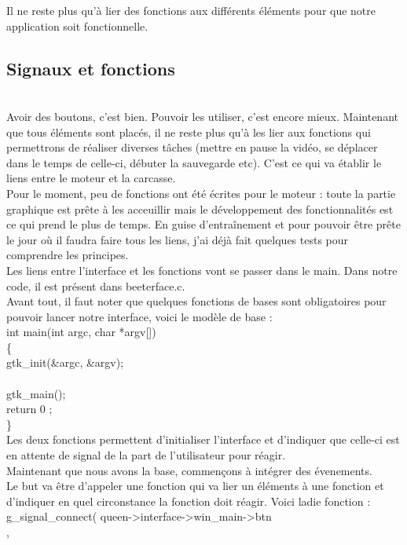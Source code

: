 \documentclass[11pt,french,a4paper]{report}
\begin{document}
Il ne reste plus qu'à lier des fonctions aux différents éléments pour que notre application soit 
fonctionnelle.\\
        
        \subsection{Signaux et fonctions} \\
Avoir des boutons, c'est bien. Pouvoir les utiliser, c'est encore mieux. Maintenant que tous éléments sont placés, 
il ne reste plus qu'à les lier aux fonctions qui permettrons de réaliser diverses tâches (mettre en pause la vidéo,
se déplacer dans le temps de celle-ci, débuter la sauvegarde etc).  C'est ce qui va établir le liens entre le moteur et la carcasse. \\
Pour le moment, peu de fonctions ont été écrites pour le moteur : toute la partie graphique est prête à les acceuillir 
mais le développement des fonctionnalités est ce qui prend le plus de temps. En guise d'entraînement et pour 
pouvoir être prête le jour où il faudra faire tous les liens, j'ai déjà fait quelques tests pour comprendre les principes. \\
Les liens entre l'interface et les fonctions vont se passer dans le main. Dans notre code, il est présent dans beeterface.c.\\
Avant tout, il faut noter que quelques fonctions de bases sont obligatoires pour pouvoir lancer notre interface, voici 
le modèle de base : \\
int main(int argc, char *argv[])    \\ 
\{ \\
 gtk\_init(&argc, &argv); \\
 [votre code] \\
 gtk\_main(); \\
 return 0 ; \\
\} \\
Les deux fonctions permettent d'initialiser l'interface et d'indiquer que celle-ci est en attente de signal
de la part de l'utilisateur pour réagir. \\
Maintenant que nous avons la base, commençons à intégrer des évenements. \\
Le but va être d'appeler une fonction qui va lier un éléments à une fonction et d'indiquer en quel circonstance 
la fonction doit réagir. Voici ladie fonction : \\
g\_signal\_connect( queen->interface->win\_main->btn \\,
\end{document}
